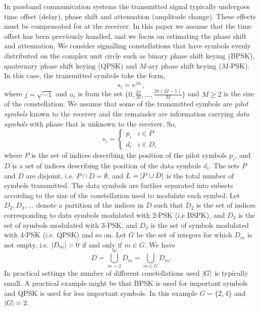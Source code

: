 \documentclass[journal]{IEEEtran}
\begin{document}
In passband communication systems the transmitted signal typically undergoes time offset (delay), phase shift and attenuation (amplitude change).  These effects must be compensated for at the receiver. In this paper we assume that the time offset has been previously handled, and we focus on estimating the phase shift and attenuation.  We consider signalling constellations that have symbols evenly distributed on the complex unit circle such as binary phase shift keying (BPSK), quaternary phase shift keying (QPSK) and $M$-ary phase shift keying ($M$-PSK).  In this case, the transmitted symbols take the form,
\[
s_i = e^{j u_i},
\]
where $j = \sqrt{-1}$ and $u_i$ is from the set $\{0, \tfrac{2\pi}{M}, \dots, \tfrac{2\pi(M-1)}{M}\}$ and $M \geq 2$ is the size of the constellation.  We assume that some of the transmitted symbols are \emph{pilot symbols} known to the receiver and the remainder are information carrying \emph{data symbols} with phase that is unknown to the receiver.  So,
\[
s_i = \begin{cases}
p_i & i \in P \\
d_i & i \in D,
\end{cases}
\]
where $P$ is the set of indices describing the position of the pilot symbols $p_i$, and $D$ is a set of indices describing the position of the data symbols $d_i$.  The sets $P$ and $D$ are disjoint, i.e. $P \cap D = \emptyset$, and $L = {\left\vert P \cup D \right\vert}$ is the total number of symbols transmitted.  The data symbols are further separated into subsets according to the size of the constellation used to modulate each symbol.  Let $D_2,D_3,\dots$ denote a partition of the indices in $D$ such that $D_2$ is the set of indices corresponding to data symbols modulated with $2$-PSK (i.e BSPK), and $D_3$ is the set of symbols modulated with $3$-PSK, and $D_4$ is the set of symbols modulated with $4$-PSK (i.e. QPSK) and so on.  Let $G$ be the set of integers for which $D_m$ is not empty, i.e. ${\left\vert D_m \right\vert} > 0$ if and only if $m \in G$.  We have 
\[
D = \bigcup_{m=2}^{\infty}D_m = \bigcup_{m\in G} D_m.
\]
In practical settings the number of different constellations used ${\left\vert G \right\vert}$ is typically small.   A practical example might be that BPSK is used for important symbols and QPSK is used for less important symbols.  In this example $G = \{2,4\}$ and ${\left\vert G \right\vert} = 2$.
\end{document}
